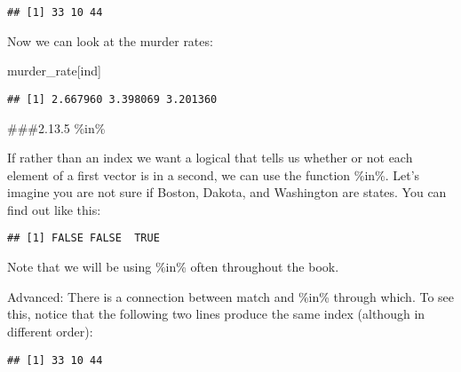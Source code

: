 \documentclass[
]{article}
\newenvironment{Shaded}{\begin{snugshade}}{\end{snugshade}}
\newcommand{\FunctionTok}[1]{\textcolor[rgb]{0.00,0.00,0.00}{#1}}
\newcommand{\NormalTok}[1]{#1}
\newcommand{\SpecialCharTok}[1]{\textcolor[rgb]{0.00,0.00,0.00}{#1}}
\newcommand{\StringTok}[1]{\textcolor[rgb]{0.31,0.60,0.02}{#1}}
\begin{document}
\begin{verbatim}
## [1] 33 10 44
\end{verbatim}

Now we can look at the murder rates:

\begin{Shaded}
\begin{Highlighting}[]
\NormalTok{murder\_rate[ind]}
\end{Highlighting}
\end{Shaded}

\begin{verbatim}
## [1] 2.667960 3.398069 3.201360
\end{verbatim}

\#\#\#2.13.5 \%in\%

If rather than an index we want a logical that tells us whether or not
each element of a first vector is in a second, we can use the function
\%in\%. Let's imagine you are not sure if Boston, Dakota, and Washington
are states. You can find out like this:

\begin{Shaded}
\end{Shaded}

\begin{verbatim}
## [1] FALSE FALSE  TRUE
\end{verbatim}

Note that we will be using \%in\% often throughout the book.

Advanced: There is a connection between match and \%in\% through which.
To see this, notice that the following two lines produce the same index
(although in different order):

\begin{Shaded}
\end{Shaded}

\begin{verbatim}
## [1] 33 10 44
\end{verbatim}
\end{document}
